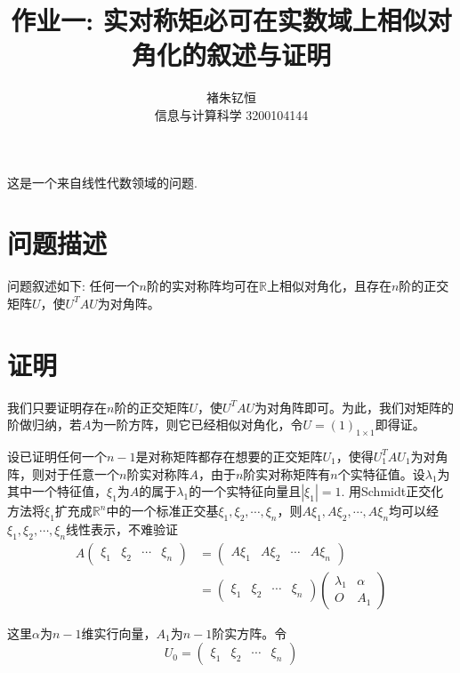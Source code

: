 \documentclass{ctexart}
\title{作业一: 实对称矩必可在实数域上相似对角化的叙述与证明}
\author{褚朱钇恒 \\ 信息与计算科学 3200104144}
\begin{document}
\maketitle


这是一个来自线性代数领域的问题.
\section{问题描述}
问题叙述如下: 任何一个$n$阶的实对称阵均可在$\mathbb{R}$上相似对角化，且存在$n$阶的正交矩阵$U$，使$U^TAU$为对角阵。

\section{证明}

我们只要证明存在$n$阶的正交矩阵$U$，使$U^TAU$为对角阵即可。为此，我们对矩阵的阶做归纳，若$A$为一阶方阵，则它已经相似对角化，令$U=(1)_{1\times 1}$即得证。

设已证明任何一个$n-1$是对称矩阵都存在想要的正交矩阵$U_1$，使得$U_1^TAU_1$为对角阵，则对于任意一个$n$阶实对称阵$A$，由于$n$阶实对称矩阵有$n$个实特征值。设$\lambda_1$为其中一个特征值，$\xi_1$为$A$的属于$\lambda_1$的一个实特征向量且$|\xi_1|=1$. 用Schmidt正交化方法将$\xi_1$扩充成$\mathbb{R}^n$中的一个标准正交基$\xi_1,\xi_2,\cdots,\xi_n$，则$A\xi_1,A\xi_2,\cdots,A\xi_n$均可以经$\xi_1,\xi_2,\cdots,\xi_n$线性表示，不难验证
\begin{equation}
    \begin{split}
    A\begin{pmatrix} \xi_1 & \xi_2 & \cdots & \xi_n \end{pmatrix}
    &=\begin{pmatrix} A\xi_1 & A\xi_2 & \cdots & A\xi_n \end{pmatrix} \\
    &=\begin{pmatrix} \xi_1 & \xi_2 & \cdots & \xi_n \end{pmatrix}\begin{pmatrix} \lambda_1 & \alpha \\ O &A_1 \end{pmatrix}
    \end{split}
    \label{eq::eq1}
\end{equation}

这里$\alpha$为$n-1$维实行向量，$A_1$为$n-1$阶实方阵。令
$$U_0=\begin{pmatrix} \xi_1 & \xi_2 & \cdots & \xi_n \end{pmatrix}$$
\end{document}
